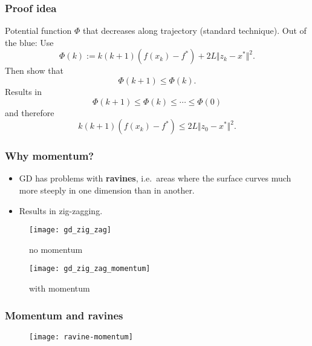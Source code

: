 \documentclass[aspectratio=149]{beamer}
\begin{document}
\begin{frame}
  \frametitle{Proof idea}
  Potential function $\Phi$ that decreases along trajectory (standard technique).
  Out of the blue: Use
  \begin{equation}
    \Phi(k) := k(k+1) (f(x_k) - f^*) + 2L \Vert z_k - x^* \Vert^2.
  \end{equation}
  Then show that
  \begin{equation}
    \Phi(k+1) \le \Phi(k).
  \end{equation}
  Results in
  \begin{equation}
    \Phi(k+1) \le \Phi(k) \le \cdots \le \Phi(0)
  \end{equation}
  and therefore
  \begin{equation}
    k(k+1) (f(x_k) - f^*)  \le 2L \Vert z_0 - x^* \Vert^2.
  \end{equation}
\end{frame}


\begin{frame}
  \frametitle{Why momentum?}
  \begin{itemize}
    \item GD has problems with \textbf{ravines}, i.e.\ areas where the surface curves much more steeply in one dimension than in another.
    \item Results in zig-zagging.
  \end{itemize}

  \begin{minipage}{0.48\textwidth}
    \begin{figure}[ht]
      \centering
      \texttt{[image: gd\_zig\_zag]}
      \caption{no momentum}
    \end{figure}
  \end{minipage}
  \begin{minipage}{0.48\textwidth}
    \begin{figure}[ht]
      \centering
      \texttt{[image: gd\_zig\_zag\_momentum]}
      \caption{with momentum}
    \end{figure}
  \end{minipage}
\end{frame}


\begin{frame}
  \frametitle{Momentum and ravines}
  \begin{figure}[ht]
    \centering
    \texttt{[image: ravine-momentum]}
    \caption{\label{fig:label} }
  \end{figure}
\end{frame}
\end{document}
